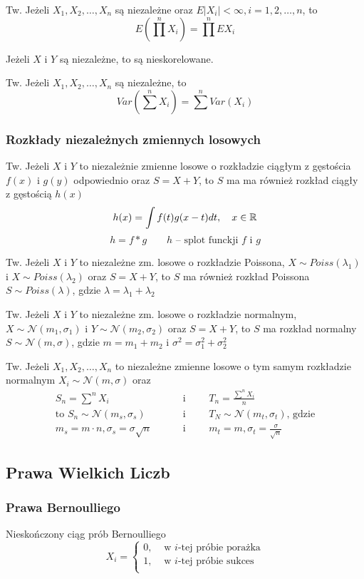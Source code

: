 \documentclass[../Matematyka.tex]{subfiles}
\begin{document}
Tw. Jeżeli \(X_1, X_2, \ldots, X_n\) są niezależne oraz \(E|X_i|<\infty, i = 1, 2, \ldots, n\), to
\[E(\prod^n X_i) = \prod^n EX_i\]

Jeżeli \(X\) i \(Y\) są niezależne, to są nieskorelowane.

Tw. Jeżeli \(X_1, X_2, \ldots, X_n\) są niezależne, to
\[Var(\sum^n X_i) = \sum^n Var(X_i)\]

\subsubsection{Rozkłady niezależnych zmiennych losowych}
Tw. Jeżeli \(X\) i \(Y\) to niezależnie zmienne losowe o rozkładzie ciągłym z gęstościa \(f(x)\) i \(g(y)\) odpowiednio oraz \(S = X + Y\), to \(S\) ma ma również rozkład ciągły z gęstością \(h(x)\)
\[h(x) = \int f(t)g(x-t)dt, \quad x \in \mathbb{R}\]
\[h = f * g \qquad h \text{ -- splot funckji } f \text{ i } g\]

Tw. Jeżeli \(X\) i \(Y\) to niezależne zm. losowe o rozkładzie Poissona, \(X \sim Poiss(\lambda_1)\) i \(X \sim Poiss(\lambda_2)\) oraz \(S = X + Y\), to \(S\) ma również rozkład Poissona \(S \sim Poiss(\lambda)\), gdzie \(\lambda = \lambda_1 + \lambda_2\)

Tw. Jeżeli \(X\) i \(Y\) to niezależne zm. losowe o rozkładzie normalnym, \(X \sim \mathcal{N} (m_1, \sigma_1)\) i \(Y \sim \mathcal{N} (m_2, \sigma_2)\) oraz \(S = X + Y\), to \(S\) ma rozkład normalny \(S \sim \mathcal{N} (m, \sigma)\), gdzie \(m = m_1 + m_2\) i \(\sigma^2 = \sigma_1^2 + \sigma_2^2\)

Tw. Jeżeli \(X_1, X_2, \ldots, X_n\) to niezależne zmienne losowe o tym samym rozkładzie normalnym \(X_i \sim \mathcal{N} (m, \sigma)\) oraz
\begin{align*}
    S_n = \sum^n X_i \qquad                               & \text{ i }\qquad T_n = \frac{\displaystyle\sum^n X_i}{n}              \\
    \text{to } S_n \sim \mathcal{N}(m_s, \sigma_s) \qquad & \text{ i } \qquad T_N \sim \mathcal{N} (m_t, \sigma_t) \text{, gdzie} \\
    m_s = m \cdot n, \sigma_s = \sigma\sqrt{n} \qquad     & \text{ i } \qquad m_t=m, \sigma_t=\frac{\sigma}{\sqrt{n}}
\end{align*}

\newpage
\subsection{Prawa Wielkich Liczb}
\subsubsection{Prawa Bernoulliego}
Nieskończony ciąg prób Bernoulliego
\[X_i = \begin{cases}
        0, & \text{ w } i\text{-tej próbie porażka} \\
        1, & \text{ w } i\text{-tej próbie sukces}  \\
    \end{cases}\]
\end{document}
